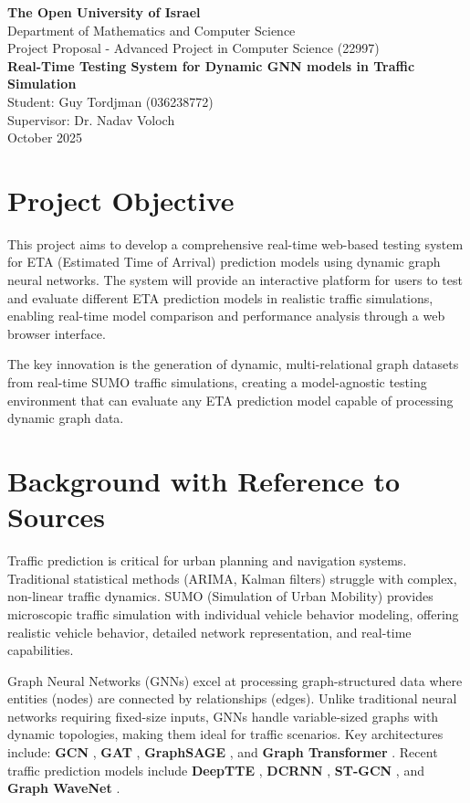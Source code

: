 \documentclass[12pt,a4paper]{article}
\begin{document}
\begin{center}
{\Large\bfseries The Open University of Israel}\\
Department of Mathematics and Computer Science\\[0.5cm]
{\large Project Proposal - Advanced Project in Computer Science (22997)}\\[1cm]
{\LARGE\bfseries Real-Time Testing System for Dynamic GNN models in Traffic Simulation}\\[1cm]
{\large Student: Guy Tordjman (036238772)}\\
{\large Supervisor: Dr. Nadav Voloch}\\
{\large October 2025}
\end{center}

\vspace{0.5cm}

\section{Project Objective}

This project aims to develop a comprehensive real-time web-based testing system for ETA (Estimated Time of Arrival) prediction models using dynamic graph neural networks. The system will provide an interactive platform for users to test and evaluate different ETA prediction models in realistic traffic simulations, enabling real-time model comparison and performance analysis through a web browser interface.

The key innovation is the generation of dynamic, multi-relational graph datasets from real-time SUMO traffic simulations, creating a model-agnostic testing environment that can evaluate any ETA prediction model capable of processing dynamic graph data.

\section{Background with Reference to Sources}

Traffic prediction is critical for urban planning and navigation systems. Traditional statistical methods (ARIMA, Kalman filters) struggle with complex, non-linear traffic dynamics. SUMO (Simulation of Urban Mobility) \cite{SUMO2018} provides microscopic traffic simulation with individual vehicle behavior modeling, offering realistic vehicle behavior, detailed network representation, and real-time capabilities.

Graph Neural Networks (GNNs) excel at processing graph-structured data where entities (nodes) are connected by relationships (edges). Unlike traditional neural networks requiring fixed-size inputs, GNNs handle variable-sized graphs with dynamic topologies, making them ideal for traffic scenarios. Key architectures include: \textbf{GCN} \cite{kipf2017gcn}, \textbf{GAT} \cite{velivckovic2017graph}, \textbf{GraphSAGE} \cite{hamilton2017inductive}, and \textbf{Graph Transformer} \cite{dwivedi2020generalization}. Recent traffic prediction models include \textbf{DeepTTE} \cite{deepTTE2018}, \textbf{DCRNN} \cite{dcrnn2018}, \textbf{ST-GCN} \cite{yu2018stgcn}, and \textbf{Graph WaveNet} \cite{wu2019graphwavenet}.
\end{document}
